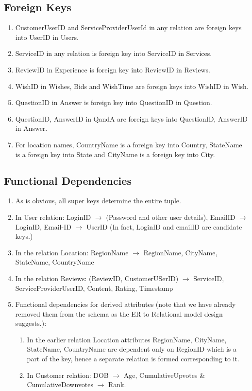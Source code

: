 \documentclass[a4paper]{article}
\begin{document}
\subsection{Foreign Keys}
\begin{enumerate}
\item CustomerUserID and ServiceProviderUserId in any relation are foreign keys into UserID in Users.
\item ServiceID in any relation is foreign key into ServiceID in Services.
\item ReviewID in Experience is foreign key into ReviewID in Reviews.
\item WishID in Wishes, Bids and WishTime are foreign keys into WishID in Wish.
\item QuestionID in Answer is foreign key into QuestionID in Question.
\item QuestionID, AnswerID in QandA are foreign keys into QuestionID, AnswerID in Answer.
\item For location names, CountryName is a foreign key into Country, StateName is a foreign key into State and CityName is a foreign key into City.
\end{enumerate}



\subsection{Functional Dependencies}
\begin{enumerate}
\item As is obvious, all super keys determine the entire tuple.
\item In User relation: LoginID $\to$ (Password and other user details), EmailID $\to$ LoginID, Email-ID $\to$ UserID (In fact, LoginID and emailID are candidate keys.)
\item In the relation Location:  RegionName $\to$ RegionName, CityName, StateName, CountryName 
\item In the relation Reviews: (ReviewID, CustomerUSerID) $\to$  ServiceID, ServiceProviderUserID, Content, Rating, Timestamp
\item Functional dependencies for derived attributes (note that we have already removed them from the schema as the ER to Relational model design suggests.):
\begin{enumerate}
\item In the earlier relation Location attributes RegionName, CityName, StateName, CountryName are dependent only on RegionID which is a part of the key, hence a separate relation is formed corresponding to it.
\item In Customer relation: DOB $\to$ Age,  CumulativeUpvotes \& CumulativeDownvotes $\to$ Rank.
\end{enumerate}
\end{enumerate}
\end{document}
